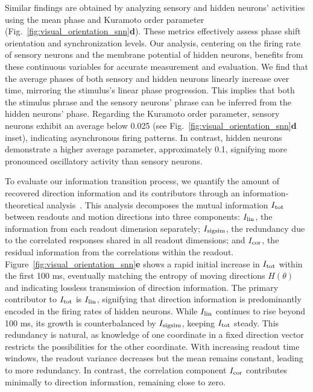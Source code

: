 Similar findings are obtained by analyzing sensory and hidden neurons' activities using the mean phase and Kuramoto order parameter (Fig.~\ref{fig:visual_orientation_snn}\textbf{d}). 
These metrics effectively assess phase shift orientation and synchronization levels. 
Our analysis, centering on the firing rate of sensory neurons and the membrane potential of hidden neurons, benefits from these continuous variables for accurate measurement and evaluation.
We find that the average phases of both sensory and hidden neurons linearly increase over time, mirroring the stimulus's linear phase progression. 
This implies that both the stimulus phrase and the sensory neurons' phrase can be inferred from the hidden neurons' phase.
Regarding the Kuramoto order parameter, sensory neurons exhibit an average below 0.025 (see Fig.~\ref{fig:visual_orientation_snn}\textbf{d} inset), indicating asynchronous firing patterns. 
In contrast, hidden neurons demonstrate a higher average parameter, approximately 0.1, signifying more pronounced oscillatory activity than sensory neurons.

To evaluate our information transition process, we quantify the amount of recovered direction information and its contributors through an information-theoretical analysis~\cite{Pola2003}. 
This analysis decomposes the mutual information \(I_{\rm tot}\) between readouts and motion directions into three components: \(I_{\rm lin}\), the information from each readout dimension separately; $I_{\rm sigsim}$, the redundancy due to the correlated responses shared in all readout dimensions; and $I_{\rm cor}$, the residual information from the correlations within the readout.
Figure~\ref{fig:visual_orientation_snn}\textbf{e} shows a rapid initial increase in \(I_{\rm tot}\) within the first 100 ms, eventually matching the entropy of moving directions \(H(\theta)\) and indicating lossless transmission of direction information. 
The primary contributor to \(I_{\rm tot}\) is \(I_{\rm lin}\), signifying that direction information is predominantly encoded in the firing rates of hidden neurons. 
While \(I_{\rm lin}\) continues to rise beyond 100 ms, its growth is counterbalanced by \(I_{\rm sigsim}\), keeping \(I_{\rm tot}\) steady. 
This redundancy is natural, as knowledge of one coordinate in a fixed direction vector restricts the possibilities for the other coordinate. 
With increasing readout time windows, the readout variance decreases but the mean remains constant, leading to more redundancy. 
In contrast, the correlation component \(I_{\rm cor}\) contributes minimally to direction information, remaining close to zero.

